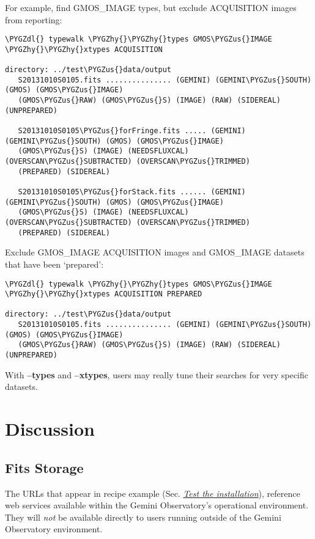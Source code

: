 \documentclass[letterpaper,10pt,english]{sphinxmanual}
\def\PYGZus{\char`\_}
\def\PYGZdl{\char`\$}
\def\PYGZhy{\char`\-}
\begin{document}
For example, find GMOS\_IMAGE types, but exclude ACQUISITION images from reporting:

\begin{Verbatim}[commandchars=\\\{\}]
\PYGZdl{} typewalk \PYGZhy{}\PYGZhy{}types GMOS\PYGZus{}IMAGE \PYGZhy{}\PYGZhy{}xtypes ACQUISITION

directory: ../test\PYGZus{}data/output
   S20131010S0105.fits ............... (GEMINI) (GEMINI\PYGZus{}SOUTH) (GMOS) (GMOS\PYGZus{}IMAGE)
   (GMOS\PYGZus{}RAW) (GMOS\PYGZus{}S) (IMAGE) (RAW) (SIDEREAL) (UNPREPARED)

   S20131010S0105\PYGZus{}forFringe.fits ..... (GEMINI) (GEMINI\PYGZus{}SOUTH) (GMOS) (GMOS\PYGZus{}IMAGE)
   (GMOS\PYGZus{}S) (IMAGE) (NEEDSFLUXCAL) (OVERSCAN\PYGZus{}SUBTRACTED) (OVERSCAN\PYGZus{}TRIMMED)
   (PREPARED) (SIDEREAL)

   S20131010S0105\PYGZus{}forStack.fits ...... (GEMINI) (GEMINI\PYGZus{}SOUTH) (GMOS) (GMOS\PYGZus{}IMAGE)
   (GMOS\PYGZus{}S) (IMAGE) (NEEDSFLUXCAL) (OVERSCAN\PYGZus{}SUBTRACTED) (OVERSCAN\PYGZus{}TRIMMED)
   (PREPARED) (SIDEREAL)
\end{Verbatim}

Exclude GMOS\_IMAGE ACQUISITION images and GMOS\_IMAGE datasets that have been `prepared':

\begin{Verbatim}[commandchars=\\\{\}]
\PYGZdl{} typewalk \PYGZhy{}\PYGZhy{}types GMOS\PYGZus{}IMAGE \PYGZhy{}\PYGZhy{}xtypes ACQUISITION PREPARED

directory: ../test\PYGZus{}data/output
   S20131010S0105.fits ............... (GEMINI) (GEMINI\PYGZus{}SOUTH) (GMOS) (GMOS\PYGZus{}IMAGE)
   (GMOS\PYGZus{}RAW) (GMOS\PYGZus{}S) (IMAGE) (RAW) (SIDEREAL) (UNPREPARED)
\end{Verbatim}

With \textbf{--types} and \textbf{--xtypes}, users may really tune their searches for very
specific datasets.


\chapter{Discussion}
\label{discuss:discussion}\label{discuss::doc}

\section{Fits Storage}
\label{discuss:fits-storage}\label{discuss:fitsstore}
The URLs that appear in  recipe example (Sec. {\hyperref[userenv:test]{\emph{Test the installation}}}), reference web services
available within the Gemini Observatory's operational environment. They will
\emph{not} be available directly to users running  outside of the Gemini
Observatory environment.
\end{document}
